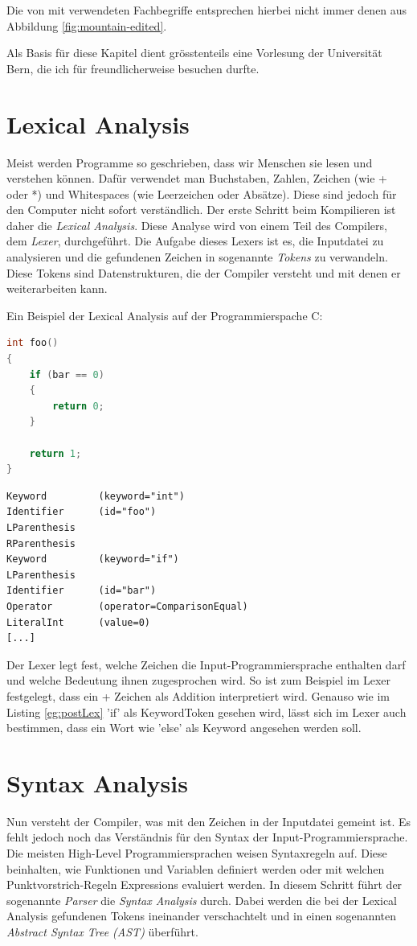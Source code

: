 Die von mit verwendeten Fachbegriffe entsprechen hierbei nicht immer denen aus Abbildung \ref{fig:mountain-edited}.

Als Basis für diese Kapitel dient grösstenteils eine Vorlesung der Universität Bern, die ich für freundlicherweise besuchen durfte.

\section{Lexical Analysis}
Meist werden Programme so geschrieben, dass wir Menschen sie lesen und verstehen können. Dafür verwendet man Buchstaben, Zahlen, Zeichen (wie + oder *) und Whitespaces (wie Leerzeichen oder Absätze).
Diese sind jedoch für den Computer nicht sofort verständlich. Der erste Schritt beim Kompilieren ist daher die \textit{Lexical Analysis}. Diese Analyse wird von einem Teil des Compilers, dem \textit{Lexer}, durchgeführt.
Die Aufgabe dieses Lexers ist es, die Inputdatei zu analysieren und die gefundenen Zeichen in sogenannte \textit{Tokens} zu verwandeln. Diese Tokens sind Datenstrukturen, die der Compiler versteht und mit denen er weiterarbeiten kann.

Ein Beispiel der Lexical Analysis auf der Programmierspache C:

\begin{lstlisting}[language=C, label=eg:preLex, caption=C code vor Lexical Analysis]
int foo()
{
    if (bar == 0)
    {
        return 0;
    }

    return 1;
}
\end{lstlisting}

\begin{lstlisting}[label=eg:postLex, caption=Tokens nach Lexical Analysis]
Keyword         (keyword="int")
Identifier      (id="foo")
LParenthesis
RParenthesis
Keyword         (keyword="if")
LParenthesis
Identifier      (id="bar")
Operator        (operator=ComparisonEqual)
LiteralInt      (value=0)
[...]
\end{lstlisting}

Der Lexer legt fest, welche Zeichen die Input-Programmiersprache enthalten darf und welche Bedeutung ihnen zugesprochen wird. So ist zum Beispiel im Lexer festgelegt, dass ein + Zeichen als Addition interpretiert wird.
Genauso wie im Listing \ref{eg:postLex} 'if' als KeywordToken gesehen wird, lässt sich im Lexer auch bestimmen, dass ein Wort wie 'else' als Keyword angesehen werden soll.

\section{Syntax Analysis}
Nun versteht der Compiler, was mit den Zeichen in der Inputdatei gemeint ist. Es fehlt jedoch noch das Verständnis für den Syntax der Input-Programmiersprache.
Die meisten High-Level Programmiersprachen weisen Syntaxregeln auf. Diese beinhalten, wie Funktionen und Variablen definiert werden oder mit welchen Punktvorstrich-Regeln Expressions evaluiert werden.
In diesem Schritt führt der sogenannte \textit{Parser} die \textit{Syntax Analysis} durch.
Dabei werden die bei der Lexical Analysis gefundenen Tokens ineinander verschachtelt und in einen sogenannten \textit{Abstract Syntax Tree (AST)} überführt.

